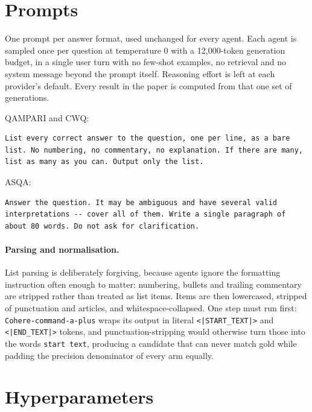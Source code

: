 \documentclass[11pt]{article}
\begin{document}



\newpage
\appendix

\section{Prompts}
\label{app:prompts}

One prompt per answer format, used unchanged for every agent. Each agent is sampled once per question at temperature 0 with a 12,000-token generation budget, in a single user turn with no few-shot examples, no retrieval and no system message beyond the prompt itself. Reasoning effort is left at each provider's default. Every result in the paper is computed from that one set of generations.

QAMPARI and CWQ:
\begin{verbatim}
List every correct answer to the question, one per line, as a bare
list. No numbering, no commentary, no explanation. If there are many,
list as many as you can. Output only the list.
\end{verbatim}

ASQA:
\begin{verbatim}
Answer the question. It may be ambiguous and have several valid
interpretations -- cover all of them. Write a single paragraph of
about 80 words. Do not ask for clarification.
\end{verbatim}

\paragraph{Parsing and normalisation.}
List parsing is deliberately forgiving, because agents ignore the formatting instruction often enough to matter: numbering, bullets and trailing commentary are stripped rather than treated as list items. Items are then lowercased, stripped of punctuation and articles, and whitespace-collapsed. One step must run first: \texttt{Cohere-command-a-plus} wraps its output in literal \verb+<|START_TEXT|>+ and \verb+<|END_TEXT|>+ tokens, and punctuation-stripping would otherwise turn those into the words \texttt{start text}, producing a candidate that can never match gold while padding the precision denominator of every arm equally.

\section{Hyperparameters}
\label{app:hyper}
\end{document}

